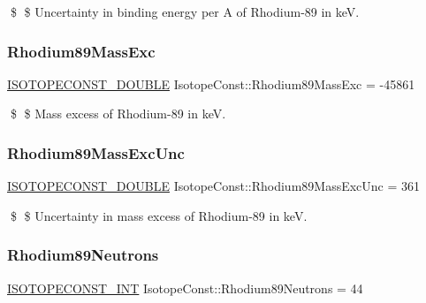 \$ \$ Uncertainty in binding energy per A of Rhodium-\/89 in keV. \mbox{\label{group___isotope_const-_rhodium-_rh89_ga5a792ad03fce75ab68fc78d57894080e}} 
\subsubsection{\texorpdfstring{Rhodium89\+Mass\+Exc}{Rhodium89MassExc}}
{\footnotesize\ttfamily \mbox{\hyperlink{group___isotope_const-_macros_ga8f45a7272ce02c0b4c65c44636ed719a}{I\+S\+O\+T\+O\+P\+E\+C\+O\+N\+S\+T\+\_\+\+D\+O\+U\+B\+LE}} Isotope\+Const\+::\+Rhodium89\+Mass\+Exc = -\/45861}

\$ \$ Mass excess of Rhodium-\/89 in keV. \mbox{\label{group___isotope_const-_rhodium-_rh89_ga6642818d046084611f345e6316874e8c}} 
\subsubsection{\texorpdfstring{Rhodium89\+Mass\+Exc\+Unc}{Rhodium89MassExcUnc}}
{\footnotesize\ttfamily \mbox{\hyperlink{group___isotope_const-_macros_ga8f45a7272ce02c0b4c65c44636ed719a}{I\+S\+O\+T\+O\+P\+E\+C\+O\+N\+S\+T\+\_\+\+D\+O\+U\+B\+LE}} Isotope\+Const\+::\+Rhodium89\+Mass\+Exc\+Unc = 361}

\$ \$ Uncertainty in mass excess of Rhodium-\/89 in keV. \mbox{\label{group___isotope_const-_rhodium-_rh89_ga371991bca52267aa603cca4fd4834552}} 
\subsubsection{\texorpdfstring{Rhodium89\+Neutrons}{Rhodium89Neutrons}}
{\footnotesize\ttfamily \mbox{\hyperlink{group___isotope_const-_macros_ga5f18360b3e99483a35c32d789e62621c}{I\+S\+O\+T\+O\+P\+E\+C\+O\+N\+S\+T\+\_\+\+I\+NT}} Isotope\+Const\+::\+Rhodium89\+Neutrons = 44}

